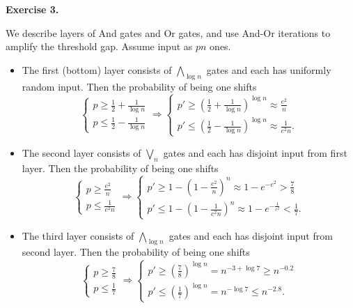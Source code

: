 \documentclass[a4paper]{article}
\newenvironment{exercise}[1]{
	\par
	\noindent\textbf{Exercise #1.}\quad
}{
	\par
	\bigskip
}
\newcommand{\pbra}[1]{\left( #1 \right)}
\begin{document}
\begin{exercise}{3}
    We describe layers of And gates and Or gates, and use And-Or iterations to amplify the threshold gap.
    Assume input as $pn$ ones.
    \begin{itemize}
        \item The first (bottom) layer consists of $\bigwedge_{\log n}$ gates and each has uniformly random input.
            Then the probability of being one shifts
            $$
            \begin{cases}
                p\geq\frac12+\frac1{\log n}\\
                p\leq\frac12-\frac1{\log n}
            \end{cases}
            \Rightarrow
            \begin{cases}
                p'\geq\pbra{\frac12+\frac1{\log n}}^{\log n}\approx\frac{e^2}n\\
                p'\leq\pbra{\frac12-\frac1{\log n}}^{\log n}\approx\frac1{e^2n}.
            \end{cases}
            $$
        \item The second layer consists of $\bigvee_{n}$ gates and each has disjoint input from first layer.
            Then the probability of being one shifts
            $$
            \begin{cases}
                p\geq\frac{e^2}{n}\\
                p\leq\frac1{e^2n}
            \end{cases}
            \Rightarrow
            \begin{cases}
                p'\geq1-\pbra{1-\frac{e^2}{n}}^{n}\approx1-e^{-e^2}>\frac78\\
                p'\leq1-\pbra{1-\frac1{e^2n}}^{n}\approx1-e^{-\frac1{e^2}}<\frac17.
            \end{cases}
            $$
        \item The third layer consists of $\bigwedge_{\log n}$ gates and each has disjoint input from second layer.
            Then the probability of being one shifts
            $$
            \begin{cases}
                p\geq\frac78\\
                p\leq\frac17
            \end{cases}
            \Rightarrow
            \begin{cases}
                p'\geq\pbra{\frac78}^{\log n}=n^{-3+\log7}\geq n^{-0.2}\\
                p'\leq\pbra{\frac17}^{\log n}=n^{-\log 7}\leq n^{-2.8}.

\end{cases}$$
\end{itemize}
\end{exercise}
\end{document}
